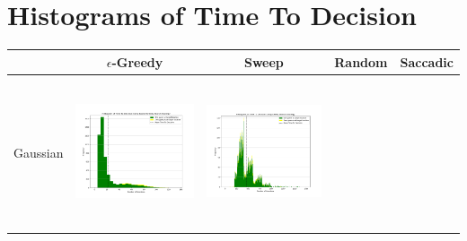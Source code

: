
\chapter{Histograms of Time To Decision}

\begin{landscape}
\centering
\vspace*{\fill}
\begin{table}[h!]
  \centering
  \begin{tabular}{ | c | c | c | c | c |}
    \hline
    & $\epsilon$-Greedy & Sweep & Random & Saccadic \\
    \hline
    Gaussian & \vline
    \begin{minipage}[c][45mm][c]{45mm}
      \includegraphics[width=44mm, height=44mm]{Chapters/MultiAgentTargetDetection/Figs/Histograms/VaryingPrior/Gaussian/GaussianEpsilonGreedyHistogram.png}
    \end{minipage}
    &
    \begin{minipage}[c][45mm][c]{45mm}
      \includegraphics[width=44mm, height=44mm]{Chapters/MultiAgentTargetDetection/Figs/Histograms/VaryingPrior/Gaussian/GaussianSweepHistogram.png}


\end{minipage}
\end{tabular}
\end{table}
\end{landscape}
